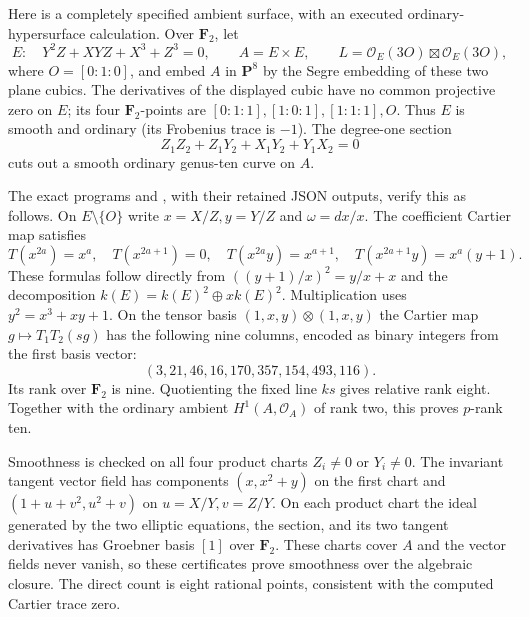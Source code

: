 \begin{example}\label{ex:ordinary-abelian-surface-explicit}
Here is a completely specified ambient surface, with an executed
ordinary-hypersurface calculation.  Over $\mathbf F_2$, let
\[
 E:\quad Y^2Z+XYZ+X^3+Z^3=0,\qquad
 A=E\times E,\qquad L=\mathcal O_E(3O)\boxtimes\mathcal O_E(3O),
\]
where $O=[0:1:0]$, and embed $A$ in $\mathbf P^8$ by the
Segre embedding of these two plane cubics.  The derivatives of
the displayed cubic have no common projective zero on $E$;
its four $\mathbf F_2$-points are
$[0:1:1],[1:0:1],[1:1:1],O$.
Thus $E$ is smooth and ordinary (its Frobenius trace is $-1$).
The degree-one section
\begin{equation}\label{eq:abelian-degree-one-example}
 Z_1Z_2+Z_1Y_2+X_1Y_2+Y_1X_2=0
\end{equation}
cuts out a smooth ordinary genus-ten curve on $A$.

The exact programs  and
, with their retained
JSON outputs, verify this as follows.  On $E\setminus\{O\}$
write $x=X/Z,y=Y/Z$ and $\omega=dx/x$.
The coefficient Cartier map satisfies
\[
 T(x^{2a})=x^a,\quad T(x^{2a+1})=0,\quad
 T(x^{2a}y)=x^{a+1},\quad T(x^{2a+1}y)=x^a(y+1).
\]
These formulas follow directly from
$((y+1)/x)^2=y/x+x$ and the decomposition
$k(E)=k(E)^2\oplus xk(E)^2$.
Multiplication uses $y^2=x^3+xy+1$.
On the tensor basis $(1,x,y)\otimes(1,x,y)$ the Cartier
map $g\mapsto T_1T_2(sg)$ has the following nine columns,
encoded as binary integers from the first basis vector:
\[
 (3,21,46,16,170,357,154,493,116).
\]
Its rank over $\mathbf F_2$ is nine.  Quotienting the fixed
line $ks$ gives relative rank eight.  Together with the
ordinary ambient $H^1(A,\mathcal O_A)$ of rank two, this
proves $p$-rank ten.

Smoothness is checked on all four product charts
$Z_i\ne0$ or $Y_i\ne0$.
The invariant tangent vector field has components
$(x,x^2+y)$ on the first chart and
$(1+u+v^2,u^2+v)$ on $u=X/Y,v=Z/Y$.
On each product chart the ideal generated by the two
elliptic equations, the section, and its two tangent
derivatives has Groebner basis $[1]$ over $\mathbf F_2$.
These charts cover $A$ and the vector fields never vanish,
so these certificates prove smoothness over the algebraic
closure.  The direct count is eight rational points,
consistent with the computed Cartier trace zero.


\end{example}
